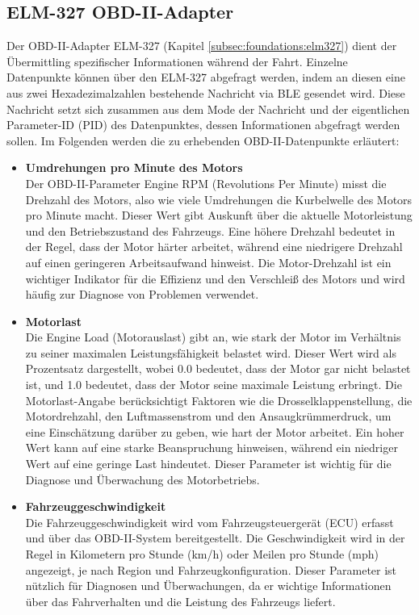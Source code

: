 \documentclass[oneside]{ausarbeitung}
\begin{document}
\subsection*{ELM-327 OBD-II-Adapter}

Der OBD-II-Adapter ELM-327 (Kapitel \ref{subsec:foundations:elm327}) dient der Übermittling spezifischer Informationen während der Fahrt. Einzelne Datenpunkte können über den ELM-327 abgefragt werden, indem an diesen eine aus zwei Hexadezimalzahlen bestehende Nachricht via BLE gesendet wird.
Diese Nachricht setzt sich zusammen aus dem Mode der Nachricht und der eigentlichen Parameter-ID (PID) des Datenpunktes, dessen Informationen abgefragt werden sollen.
Im Folgenden werden die zu erhebenden OBD-II-Datenpunkte erläutert:
\begin{itemize}
  \item \textbf{Umdrehungen pro Minute des Motors} \\ Der OBD-II-Parameter Engine RPM (Revolutions Per Minute) misst die Drehzahl des Motors, also wie viele Umdrehungen die Kurbelwelle des Motors pro Minute macht. Dieser Wert gibt Auskunft über die aktuelle Motorleistung und den Betriebszustand des Fahrzeugs. Eine höhere Drehzahl bedeutet in der Regel, dass der Motor härter arbeitet, während eine niedrigere Drehzahl auf einen geringeren Arbeitsaufwand hinweist. Die Motor-Drehzahl ist ein wichtiger Indikator für die Effizienz und den Verschleiß des Motors und wird häufig zur Diagnose von Problemen verwendet.
  \item \textbf{Motorlast} \\ Die Engine Load (Motorauslast) gibt an, wie stark der Motor im Verhältnis zu seiner maximalen Leistungsfähigkeit belastet wird. Dieser Wert wird als Prozentsatz dargestellt, wobei 0.0 bedeutet, dass der Motor gar nicht belastet ist, und 1.0 bedeutet, dass der Motor seine maximale Leistung erbringt.
  Die Motorlast-Angabe berücksichtigt Faktoren wie die Drosselklappenstellung, die Motordrehzahl, den Luftmassenstrom und den Ansaugkrümmerdruck, um eine Einschätzung darüber zu geben, wie hart der Motor arbeitet. Ein hoher Wert kann auf eine starke Beanspruchung hinweisen, während ein niedriger Wert auf eine geringe Last hindeutet. Dieser Parameter ist wichtig für die Diagnose und Überwachung des Motorbetriebs.
  \item \textbf{Fahrzeuggeschwindigkeit} \\  Die Fahrzeuggeschwindigkeit wird vom Fahrzeugsteuergerät (ECU) erfasst und über das OBD-II-System bereitgestellt. Die Geschwindigkeit wird in der Regel in Kilometern pro Stunde (km/h) oder Meilen pro Stunde (mph) angezeigt, je nach Region und Fahrzeugkonfiguration. Dieser Parameter ist nützlich für Diagnosen und Überwachungen, da er wichtige Informationen über das Fahrverhalten und die Leistung des Fahrzeugs liefert.

\end{itemize}
\end{document}
